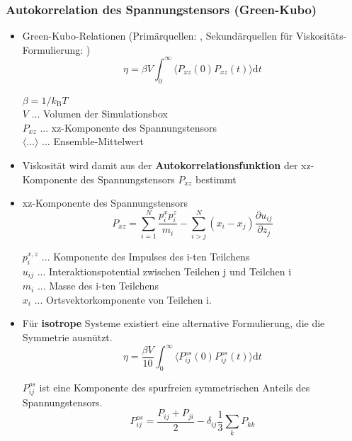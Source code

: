 \documentclass[a4paper, 10pt, 
               numbers=noenddot, toc=graduated,
               headsepline=true, footsepline=true,
               twoside=false, titlepage=true, 
               bibliography=totoc]{scrartcl}
\begin{document}
	\subsubsection{Autokorrelation des Spannungstensors (Green-Kubo)}
		\begin{itemize}
			 \item Green-Kubo-Relationen (Primärquellen: \cite{Green1954,Kubo1957}, Sekundärquellen für Viskositäts-Formulierung: \cite{Kirova2015,Tenney2010})
			 	\begin{equation}\label{eqn:green_kubo}
			 		\eta = \beta V \int_0^\infty \langle P_{xz}(0) P_{xz}(t) \rangle \mathrm{d} t 
				\end{equation}			 
				
				$\beta = 1/k_\mathrm{B} T$\\
				$V$ ... Volumen der Simulationsbox\\
				$P_{xz}$ ... xz-Komponente des Spannungstensors\\
				$\langle \ldots \rangle$ ... Ensemble-Mittelwert
			 
		 	\item Viskosität wird damit aus der \textbf{Autokorrelationsfunktion} der xz-Komponente des Spannungstensors $P_{xz}$ bestimmt
		 	\item xz-Komponente des Spannungstensors \cite{Kirova2015}
		 		\begin{equation}
					P_{xz} = \sum_{i=1}^N \frac{p_i^x p_i^z}{m_i} - \sum_{i>j}^N (x_i - x_j) \frac{\partial u_{ij} }{\partial z_j}	 	
			 	\end{equation}
			 	
			 	$p_i^{x,z}$ ... Komponente des Impulses des i-ten Teilchens\\ 
			 	$u_{ij}$ ... Interaktionspotential zwischen Teilchen j und Teilchen i\\
			 	$m_i$ ... Masse des i-ten Teilchens\\
			 	$x_i$ ... Ortsvektorkomponente von Teilchen i.
			 	
			\item Für \textbf{isotrope} Systeme existiert eine alternative Formulierung, die die Symmetrie ausnützt\cite{Tenney2010,Daivis1994}.
				\begin{equation}
					\eta = \frac{\beta V}{10} \int_0^\infty \langle P_{ij}^{os}(0) P_{ij}^{os}(t) \rangle \mathrm{d} t
				\end{equation}
			   
			    $P_{ij}^{os}$ ist eine Komponente des spurfreien symmetrischen Anteils des Spannungstensors.
			    \begin{equation}
			    	P_{ij}^{os} = \frac{P_{ij} + P_{ji} }{2} - \delta_{ij} \frac 1 3 \sum_k P_{kk}
			    \end{equation}
			    

\end{itemize}
\end{document}
